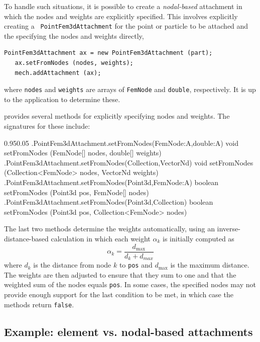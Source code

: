 To handle such situations, it is possible to create a {\it
nodal-based} attachment in which the nodes and weights are explicitly
specified. This involves explicitly creating a {\tt
PointFem3dAttachment} for the point or particle to be attached and the
specifying the nodes and weights directly,
%
\begin{lstlisting}[]
   PointFem3dAttachment ax = new PointFem3dAttachment (part);
   ax.setFromNodes (nodes, weights);
   mech.addAttachment (ax);
\end{lstlisting}
%
where {\tt nodes} and {\tt weights} are arrays of {\tt FemNode} and
{\tt double}, respectively. It is up to the application to determine
these.

 provides
several methods for explicitly specifying nodes and weights. The
signatures for these include:
\begin{methodtable}{0.95}{0.05}
\midline
%
\methodentry
{\fem.PointFem3dAttachment.setFromNodes(FemNode:A,double:A)}%
{void setFromNodes (FemNode[] nodes, double[] weights)}%
{\ }%
%
\methodentry
{\fem.PointFem3dAttachment.setFromNodes(Collection,VectorNd)}%
{void setFromNodes (Collection<FemNode> nodes, VectorNd weights)}%
{\ }%
%
\methodentry
{\fem.PointFem3dAttachment.setFromNodes(Point3d,FemNode:A)}%
{boolean setFromNodes (Point3d pos, FemNode[] nodes)}%
{\ }%
%
\methodentry
{\fem.PointFem3dAttachment.setFromNodes(Point3d,Collection)}%
{boolean setFromNodes (Point3d pos, Collection<FemNode> nodes)}%
{\ }%
%
\midline
\end{methodtable}
The last two methods determine the weights automatically, using an
inverse-distance-based calculation in which each weight $\alpha_k$
is initially computed as
%
\begin{equation}
\alpha_k = \frac{d_{\text{max}}}{d_k + d_{max}}
\label{invDistWeights:eqn}
\end{equation}
%
where $d_k$ is the distance from node $k$ to {\tt pos} and
$d_{\text{max}}$ is the maximum distance. The weights are then
adjusted to ensure that they sum to one and that the weighted sum of
the nodes equals {\tt pos}. In some cases, the specified nodes
may not provide enough support for the last condition to be
met, in which case the methods return {\tt false}.

\subsection{Example: element vs. nodal-based attachments}

